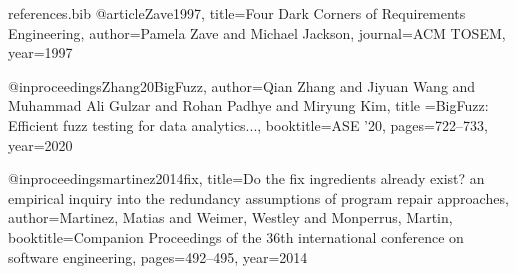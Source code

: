 \documentclass[runningheads]{llncs}
\begin{document}
\begin{filecontents}{references.bib}
@article{Zave1997,
  title={Four Dark Corners of Requirements Engineering},
  author={Pamela Zave and Michael Jackson}, journal={ACM TOSEM}, year={1997}
}

@inproceedings{Zhang20BigFuzz,
  author={Qian Zhang and Jiyuan Wang and Muhammad Ali Gulzar and Rohan Padhye and Miryung Kim},
  title ={BigFuzz: Efficient fuzz testing for data analytics...},
  booktitle={ASE '20}, pages={722--733}, year={2020}
}


@inproceedings{martinez2014fix,
  title={Do the fix ingredients already exist? an empirical inquiry into the redundancy assumptions of program repair approaches},
  author={Martinez, Matias and Weimer, Westley and Monperrus, Martin},
  booktitle={Companion Proceedings of the 36th international conference on software engineering},
  pages={492--495},
  year={2014}
}

\end{filecontents}

{
  
    
}

 
\end{document}
